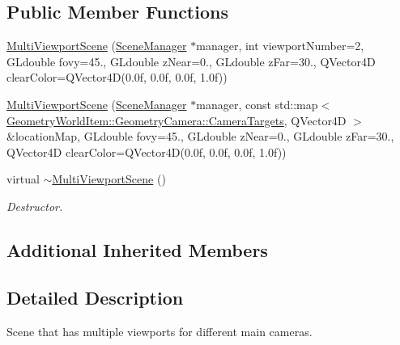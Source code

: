 \subsection*{Public Member Functions}
\begin{DoxyCompactItemize}
\item 
\mbox{\hyperlink{class_geometry_engine_1_1_geometry_scene_1_1_multi_viewport_scene_afb86dceebe9ee596c8deab499598436f}{Multi\+Viewport\+Scene}} (\mbox{\hyperlink{class_geometry_engine_1_1_scene_manager}{Scene\+Manager}} $\ast$manager, int viewport\+Number=2, G\+Ldouble fovy=45., G\+Ldouble z\+Near=0., G\+Ldouble z\+Far=30., Q\+Vector4D clear\+Color=Q\+Vector4D(0.\+0f, 0.\+0f, 0.\+0f, 1.\+0f))
\item 
\mbox{\hyperlink{class_geometry_engine_1_1_geometry_scene_1_1_multi_viewport_scene_af1d4a9e56edc5fd9375d283ccaa688b8}{Multi\+Viewport\+Scene}} (\mbox{\hyperlink{class_geometry_engine_1_1_scene_manager}{Scene\+Manager}} $\ast$manager, const std\+::map$<$ \mbox{\hyperlink{namespace_geometry_engine_1_1_geometry_world_item_1_1_geometry_camera_a3766848bae97ff8203fa26907ac359ef}{Geometry\+World\+Item\+::\+Geometry\+Camera\+::\+Camera\+Targets}}, Q\+Vector4D $>$ \&location\+Map, G\+Ldouble fovy=45., G\+Ldouble z\+Near=0., G\+Ldouble z\+Far=30., Q\+Vector4D clear\+Color=Q\+Vector4D(0.\+0f, 0.\+0f, 0.\+0f, 1.\+0f))
\item 
\mbox{\label{class_geometry_engine_1_1_geometry_scene_1_1_multi_viewport_scene_aa7aa7c6edb6944cb7959bd6e569449bc}} 
virtual \mbox{\hyperlink{class_geometry_engine_1_1_geometry_scene_1_1_multi_viewport_scene_aa7aa7c6edb6944cb7959bd6e569449bc}{$\sim$\+Multi\+Viewport\+Scene}} ()
\begin{DoxyCompactList}\small\item\em Destructor. \end{DoxyCompactList}\end{DoxyCompactItemize}
\subsection*{Additional Inherited Members}


\subsection{Detailed Description}
Scene that has multiple viewports for different main cameras. 

